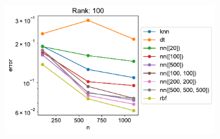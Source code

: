 \documentclass{beamer}
\begin{document}
\begin{frame}
\begin{figure}
\begin{subfigure}[b]{0.45\textwidth}
            \end{subfigure}
            \hfill
            \begin{subfigure}[b]{0.45\textwidth}
                \centering
                \includegraphics[width=\textwidth]{figs/errors_interps_100.pdf}
            \end{subfigure}
        \end{figure}
    \end{frame}
\end{document}
